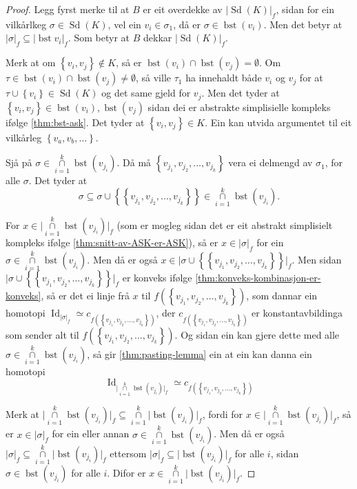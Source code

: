 \documentclass[a4paper, 12pt, norsk]{article}
\theoremstyle{plain}
\theoremstyle{definition}
\newcommand{\intersect}{ \mathop{\cap}\limits }
\newcommand{\union}{ \mathop{\cup}\limits }
\newcommand{\gr}[1]{ \lvert #1 \rvert } %
\newcommand{\set}[1]{ \left\{ #1 \right\} } %
\DeclareMathOperator{\Sd}{Sd} %
\DeclareMathOperator{\bst}{bst} %
\DeclareMathOperator{\Id}{Id} %
\begin{document}
\begin{proof}
	Legg fyrst merke til at \( B \) er eit overdekke av \( \gr{\Sd(K)}_f \), sidan for ein vilkårlkeg \( \sigma \in \Sd(K) \), vel ein \( v_i \in \sigma_1 \), då er \( \sigma \in \bst(v_i) \). Men det betyr at \( \gr{\sigma}_f \subseteq \gr{\bst{v_i}}_f \). Som betyr at \( B \) dekkar \( \gr{\Sd(K)}_f \).

	Merk at om \( \set{v_i, v_j} \not\in K \), så er \( \bst(v_i) \intersect \bst(v_j) = \emptyset \). Om \( \tau \in \bst(v_i) \intersect \bst(v_j) \neq \emptyset \), så ville \( \tau_1 \) ha innehaldt både \( v_i \) og \( v_j \) for at \( \tau \union \set{v_i} \in \Sd(K) \) og det same gjeld for \( v_j \). Men det tyder at \( \set{v_i, v_j} \in \bst(v_i), \bst(v_j) \) sidan dei er abstrakte simplisielle kompleks ifølge \autoref{thm:bst-ask}. Det tyder at \( \set{v_i, v_j} \in K \). Ein kan utvida argumentet til eit vilkårleg \( \set{v_a, v_b, \dots} \).

	Sjå på \( \sigma \in \intersect_{i = 1}^k \bst(v_{j_i}) \). Då må \( \set{v_{j_1}, v_{j_2}, \dots, v_{j_k}} \) vera ei delmengd av \( \sigma_1 \), for alle \( \sigma \). Det tyder at 
	\[ 
		\sigma \subseteq \sigma \union \set{\set{v_{j_1}, v_{j_2}, \dots, v_{j_k}}} \in \intersect_{i = 1}^k \bst(v_{j_i}).
	\]

	For \(x \in \gr{\intersect_{i = 1}^k \bst(v_{j_i})}_f \) (som er mogleg sidan det er eit abstrakt simplisielt kompleks ifølge \autoref{thm:snitt-av-ASK-er-ASK}), så er \( x \in \gr{\sigma}_f \) for ein \( \sigma \in \intersect_{i = 1}^k \bst(v_{j_i}) \). Men då er også \( x \in \gr{\sigma \union \set{\set{v_{j_1}, v_{j_2}, \dots, v_{j_k}}}}_f \). Men sidan \( \gr{\sigma \union \set{\set{v_{j_1}, v_{j_2}, \dots, v_{j_k}}}}_f \) er konveks ifølge \autoref{thm:konveks-kombinasjon-er-konveks}, så er det ei linje frå \( x \) til \( f(\set{v_{j_1}, v_{j_2}, \dots, v_{j_k}}) \), som dannar ein homotopi \( \Id_{\gr{\sigma}_f} \simeq c_{f(\set{v_{j_1}, v_{j_2}, \dots, v_{j_k}})} \), der \( c_{f(\set{v_{j_1}, v_{j_2}, \dots, v_{j_k}})} \) er konstantavbildinga som sender alt til \( f(\set{v_{j_1}, v_{j_2}, \dots, v_{j_k}}) \). Og sidan ein kan gjere dette med alle \( \sigma \in \intersect_{i = 1}^k \bst(v_{j_i}) \), så gir \autoref{thm:pasting-lemma} ein at ein kan danna ein homotopi
	\[ 
		\Id_{\gr{\intersect_{i = 1}^k \bst(v_{j_i})}_f} \simeq c_{f(\set{v_{j_1}, v_{j_2}, \dots, v_{j_k}})}
	\]

	Merk at \( \gr{\intersect_{i = 1}^k \bst(v_{j_i})}_f \subseteq \intersect_{i = 1}^k \gr{\bst(v_{j_i})}_f\), fordi for \( x \in \gr{\intersect_{i = 1}^k \bst(v_{j_i})}_f \), så er \( x \in \gr{\sigma}_f \) for ein eller annan \( \sigma \in \intersect_{i = 1}^k \bst(v_{j_i}) \). Men då er også \( \gr{\sigma}_f \subseteq \intersect_{i = 1}^k \gr{\bst(v_{j_i})}_f \) ettersom \( \gr{\sigma}_f \subseteq \gr{\bst(v_{j_i})}_f \) for alle \( i \), sidan \( \sigma \in \bst(v_{j_i}) \) for alle \( i \). Difor er \( x \in \intersect_{i = 1}^k \gr{\bst(v_{j_i})}_f \).


\end{proof}
\end{document}

